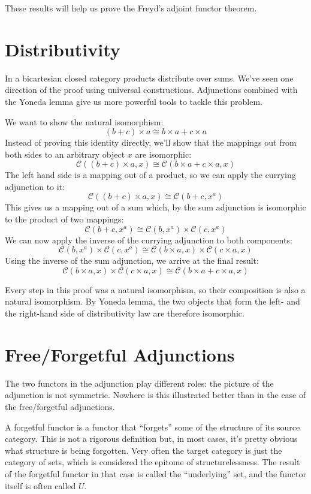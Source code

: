 \documentclass[DaoFP]{subfiles}
\begin{document}
These results will help us prove the Freyd's adjoint functor theorem. 

\section{Distributivity}

In a bicartesian closed category products distribute over sums. We've seen one direction of the proof using universal constructions. Adjunctions combined with the Yoneda lemma give us more powerful tools to tackle this problem.

We want to show the natural isomorphism:
\[(b + c) \times a \cong b \times a + c \times a \]
Instead of proving this identity directly, we'll show that the mappings out from both sides to an arbitrary object $x$ are isomorphic:
\[  \mathcal{C} ((b + c) \times a, x) \cong \mathcal{C}(b \times a + c \times a, x) \]
The left hand side is a mapping out of a product, so we can apply the currying adjunction to it:
\[  \mathcal{C} ((b + c) \times a, x) \cong \mathcal{C}(b + c, x^a) \]
This gives us a mapping out of a sum which, by the sum adjunction is isomorphic to the product of two mappings:
\[  \mathcal{C}(b + c, x^a) \cong \mathcal{C}(b, x^a) \times \mathcal{C}(c, x^a)\]
We can now apply the inverse of the currying adjunction to both components:
\[  \mathcal{C}(b, x^a) \times \mathcal{C}(c, x^a) \cong \mathcal{C}(b \times a, x) \times \mathcal{C}(c \times a, x)\]
Using the inverse of the sum adjunction, we arrive at the final result:
\[ \mathcal{C}(b \times a, x) \times \mathcal{C}(c \times a, x) \cong \mathcal{C}(b \times a + c \times a, x) \]

Every step in this proof was a natural isomorphism, so their composition is also a natural isomorphism. By Yoneda lemma, the two objects that form the left- and the right-hand side of distributivity law are therefore isomorphic.

\section{Free/Forgetful Adjunctions}
The two functors in the adjunction play different roles: the picture of the adjunction is not symmetric. Nowhere is this illustrated better than in the case of the free/forgetful adjunctions. 

A forgetful functor is a functor that ``forgets'' some of the structure of its source category. This is not a rigorous definition but, in most cases, it's pretty obvious what structure is being forgotten. Very often the target category is just the category of sets, which is considered the epitome of structurelessness. The result of the forgetful functor in that case is called the ``underlying'' set, and the functor itself is often called $U$. 
\end{document}
